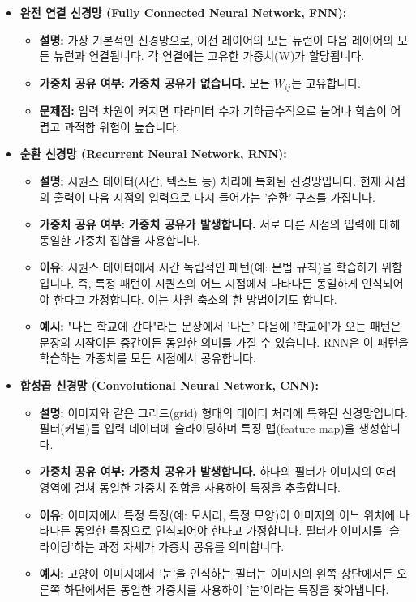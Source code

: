 \documentclass[11pt,a4paper]{article}
\theoremstyle{definition}
\begin{document}
\begin{itemize}
    \item \textbf{완전 연결 신경망 (Fully Connected Neural Network, FNN):}
    \begin{itemize}
        \item \textbf{설명:} 가장 기본적인 신경망으로, 이전 레이어의 모든 뉴런이 다음 레이어의 모든 뉴런과 연결됩니다. 각 연결에는 고유한 가중치(W)가 할당됩니다.
        \item \textbf{가중치 공유 여부:} \textbf{가중치 공유가 없습니다.} 모든 $W_{ij}$는 고유합니다.
        \item \textbf{문제점:} 입력 차원이 커지면 파라미터 수가 기하급수적으로 늘어나 학습이 어렵고 과적합 위험이 높습니다.
    \end{itemize}

    \item \textbf{순환 신경망 (Recurrent Neural Network, RNN):}
    \begin{itemize}
        \item \textbf{설명:} 시퀀스 데이터(시간, 텍스트 등) 처리에 특화된 신경망입니다. 현재 시점의 출력이 다음 시점의 입력으로 다시 들어가는 '순환' 구조를 가집니다.
        \item \textbf{가중치 공유 여부:} \textbf{가중치 공유가 발생합니다.} 서로 다른 시점의 입력에 대해 동일한 가중치 집합을 사용합니다.
        \item \textbf{이유:} 시퀀스 데이터에서 시간 독립적인 패턴(예: 문법 규칙)을 학습하기 위함입니다. 즉, 특정 패턴이 시퀀스의 어느 시점에서 나타나든 동일하게 인식되어야 한다고 가정합니다. 이는 차원 축소의 한 방법이기도 합니다.
        \item \textbf{예시:} "나는 학교에 간다"라는 문장에서 '나는' 다음에 '학교에'가 오는 패턴은 문장의 시작이든 중간이든 동일한 의미를 가질 수 있습니다. RNN은 이 패턴을 학습하는 가중치를 모든 시점에서 공유합니다.
    \end{itemize}

    \item \textbf{합성곱 신경망 (Convolutional Neural Network, CNN):}
    \begin{itemize}
        \item \textbf{설명:} 이미지와 같은 그리드(grid) 형태의 데이터 처리에 특화된 신경망입니다. 필터(커널)를 입력 데이터에 슬라이딩하며 특징 맵(feature map)을 생성합니다.
        \item \textbf{가중치 공유 여부:} \textbf{가중치 공유가 발생합니다.} 하나의 필터가 이미지의 여러 영역에 걸쳐 동일한 가중치 집합을 사용하여 특징을 추출합니다.
        \item \textbf{이유:} 이미지에서 특정 특징(예: 모서리, 특정 모양)이 이미지의 어느 위치에 나타나든 동일한 특징으로 인식되어야 한다고 가정합니다. 필터가 이미지를 '슬라이딩'하는 과정 자체가 가중치 공유를 의미합니다.
        \item \textbf{예시:} 고양이 이미지에서 '눈'을 인식하는 필터는 이미지의 왼쪽 상단에서든 오른쪽 하단에서든 동일한 가중치를 사용하여 '눈'이라는 특징을 찾아냅니다.
    \end{itemize}
\end{itemize}
\end{document}
